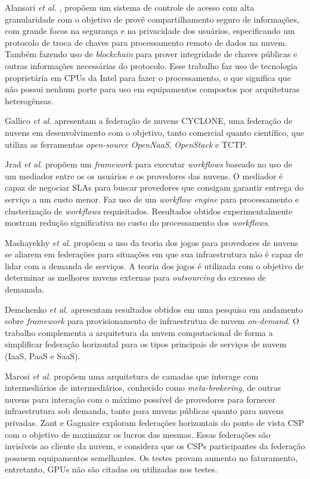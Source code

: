 Alansari \textit{et al.} \cite{ACS_Federation_7980160}, propõem um sistema de controle de acesso com alta granularidade com o objetivo de provê compartilhamento seguro de informações, com grande focos na segurança e na privacidade dos usuários, especificando um protocolo de troca de chaves para processamento remoto de dados na nuvem. Também fazendo uso de \textit{blockchain} para prover integridade de chaves públicas e outras informações necessárias do protocolo. Esse trabalho faz uso de tecnologia proprietária em \acrshort{CPU}s da Intel para fazer o processamento, o que significa que não possui nenhum porte para uso em equipamentos compostos por arquiteturas heterogêneas.

Gallico \textit{et al.} \cite{CYCLONE_7776591} apresentam a federação de nuvens CYCLONE, uma federação de nuvens em desenvolvimento com o objetivo, tanto comercial quanto científico, que utiliza as ferramentas \textit{open-source} \textit{OpenNaaS}\cite{OpenNaaS}, \textit{OpenStack}\cite{OpenStack} e \acrfull{TCTP}\cite{6735419}.

Jrad \textit{et al.} \cite{Jrad:2013:BFM:2462326.2462339} propõem um \textit{framework} para executar \textit{workflows} baseado no uso de um mediador entre os os usuários e os provedores das nuvens. O mediador é capaz de negociar \acrshort{SLA}s para buscar provedores que consigam garantir entrega do serviço a um custo menor. Faz uso de um \textit{workflow engine} para processamento e clusterização de \textit{workflows} requisitados. Resultados obtidos experimentalmente mostram redução significativa no custo do processamento dos \textit{workflows}.

Mashayekhy \textit{et al.} \cite{6853386} propõem o uso da teoria dos jogos para provedores de nuvens se aliarem em federações para situações em que sua infraestrutura não é capaz de lidar com a demanda de serviços. A teoria dos jogos é utilizada com o objetivo de determinar as melhores nuvens externas para \textit{outsourcing} do excesso de demanada.

Demchenko \textit{et al.} \cite{6427607} apresentam resultados obtidos em uma pesquisa em andamento sobre \textit{framework} para provisionamento de infraestrutua de nuvem \textit{on-demand}. O trabalho complementa a arquitetura da nuvem computacional de forma a simplificar federação horizontal para os tipos principais de serviços de nuvem (\acrshort{IaaS}, \acrshort{PaaS} e \acrshort{SaaS}).

Marosi \textit{et al.} \cite{FCM} propõem uma arquitetura de camadas que interage com intermediários de intermediários, conhecido como \textit{meta-brokering}, de outras nuvens para interação com o máximo possível de provedores para fornecer infraestrutura sob demanda, tanto para nuvens públicas quanto para nuvens privadas.
Zant e Gagnaire \cite{6814036} exploram federações horizontais do ponto de vista \acrfull{CSP} com o objetivo de maximizar os lucros das mesmas. Essas federações são invisíveis ao cliente da nuvem, e considera que os \acrshort{CSP}s participantes da federação possuem equipamentos semelhantes. Os testes provam aumento no faturamento, entretanto, \acrshort{GPU}s não são citadas ou utilizadas nos testes.

